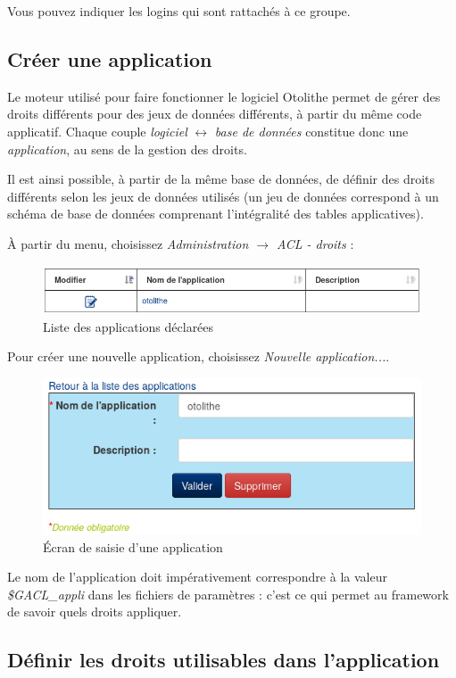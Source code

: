Vous pouvez indiquer les logins qui sont rattachés à ce groupe.


\subsection{Créer une application}
Le moteur utilisé pour faire fonctionner le logiciel Otolithe permet de gérer des droits différents pour des jeux de données différents, à partir du même code applicatif. Chaque couple \textit{logiciel} $\leftrightarrow$ \textit{base de données} constitue donc une \textit{application}, au sens de la gestion des droits.

Il est ainsi possible, à partir de la même base de données, de définir des droits différents selon les jeux de données utilisés (un jeu de données correspond à un schéma de base de données comprenant l'intégralité des tables applicatives).

À partir du menu, choisissez \textit{Administration $\rightarrow$ ACL - droits} :

\begin{figure}[H]
\centering
\includegraphics[width=0.7\linewidth]{images/liste_appli.png}
\caption{Liste des applications déclarées}
\end{figure}

Pour créer une nouvelle application, choisissez \textit{Nouvelle application...}. 

\begin{figure}[H]
\centering
\includegraphics[width=0.7\linewidth]{images/appli_change.png}
\caption{Écran de saisie d'une application}
\end{figure}

Le nom de l'application doit impérativement correspondre à la valeur \textit{\$GACL\_appli} dans les fichiers de paramètres : c'est ce qui permet au framework de savoir quels droits appliquer.

\subsection{Définir les droits utilisables dans l'application}


